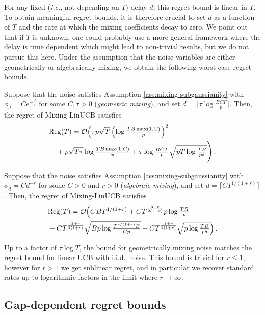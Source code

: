 For any fixed (\emph{i.e.}, not depending on $T$) delay $d$, this regret bound is linear in $T$. To obtain meaningful regret bounds, it is therefore crucial to set $d$ as a function of $T$ and the rate at which the mixing coefficients decay to zero. We point out that if $T$ is unknown, one could probably use a more general framework where the delay is time dependent which might lead to non-trivial results, but we do not pursue this here. Under the assumption that the noise variables are either geometrically or algebraically mixing, we obtain the following worst-case regret bounds.

\begin{corollary}
\label{cor:geometric_mixing}
Suppose that the noise satisfies Assumption \ref{ass:mixing-subgaussianity} with $\phi_d=Ce^{-\frac{d}{\tau}}$ for some $C,\tau >0$ (\emph{geometric mixing}), and set $d = \lceil \tau\log\tfrac{BCT}{p}\rceil$. Then, the regret of Mixing-LinUCB satisfies
\begin{align*}
&\mathrm{Reg}(T) = \mathcal{O}\Big(\tau p\sqrt{T}\left(\log\tfrac{TB\max(1,C)}{p}\right)^2 \\  &\quad+p\sqrt{T\tau}\log\tfrac{TB\max(1,C)}{p} + \tau\log\tfrac{BCT}{p}\sqrt{pT\log\tfrac{TB}{p\delta}}\Bigg)\,.
\end{align*}
\end{corollary}

\begin{corollary}
Suppose that the noise satisfies Assumption \ref{ass:mixing-subgaussianity} with $\phi_d=Cd^{-r}$ for some $C>0$ and $r >0$ (\emph{algebraic mixing}), and set $d=\lceil CT^{1/(1+r)}\rceil$. Then, the regret of Mixing-LinUCB satisfies
\begin{align*}
&\mathrm{Reg}(T) =\mathcal{O}\Big(CBT^{1/(1+r)} + CT^{\frac{3+r}{2(1+r)}}p\log\tfrac{TB}{p} \\&+ CT^{\frac{3+r}{2(1+r)}}\sqrt{Bp\log\tfrac{T^{r/(1+r)}B}{Cp}} + CT^{\frac{3+r}{2(1+r)}}\sqrt{p\log\tfrac{TB}{p\delta}}\Big)\,.
\end{align*}
\label{cor:algebraic_mixing}
\end{corollary}

Up to a factor of $\tau\log T$, the bound for geometrically mixing noise matches the regret bound for linear UCB with i.i.d.~noise. This bound is trivial for $r\leq 1$, however for $r>1$ we get sublinear regret, and in particular we recover standard rates up to logarithmic factors in the limit where $r \to \infty.$

\subsection{Gap-dependent regret bounds}

